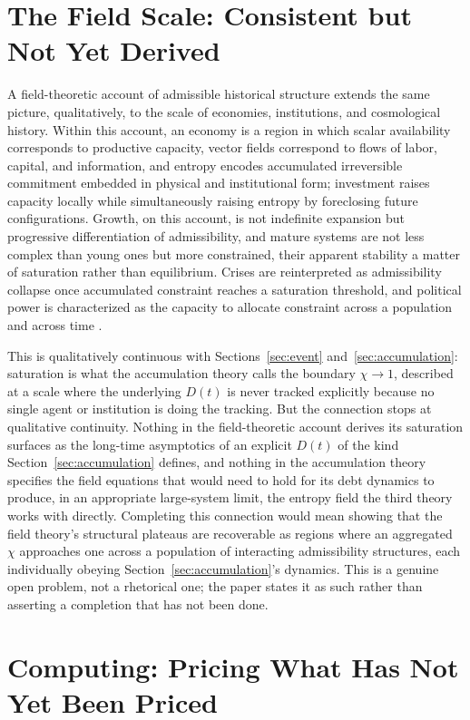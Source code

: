 \documentclass[11pt]{article}
\theoremstyle{plain}
\begin{document}
\section{The Field Scale: Consistent but Not Yet Derived}
\label{sec:field}

A field-theoretic account of admissible historical structure extends the same picture, qualitatively, to the scale of economies, institutions, and cosmological history. Within this account, an economy is a region in which scalar availability corresponds to productive capacity, vector fields correspond to flows of labor, capital, and information, and entropy encodes accumulated irreversible commitment embedded in physical and institutional form; investment raises capacity locally while simultaneously raising entropy by foreclosing future configurations. Growth, on this account, is not indefinite expansion but progressive differentiation of admissibility, and mature systems are not less complex than young ones but more constrained, their apparent stability a matter of saturation rather than equilibrium. Crises are reinterpreted as admissibility collapse once accumulated constraint reaches a saturation threshold, and political power is characterized as the capacity to allocate constraint across a population and across time \citep{rsvptheory}.

This is qualitatively continuous with Sections~\ref{sec:event} and~\ref{sec:accumulation}: saturation is what the accumulation theory calls the boundary $\chi \to 1$, described at a scale where the underlying $D(t)$ is never tracked explicitly because no single agent or institution is doing the tracking. But the connection stops at qualitative continuity. Nothing in the field-theoretic account derives its saturation surfaces as the long-time asymptotics of an explicit $D(t)$ of the kind Section~\ref{sec:accumulation} defines, and nothing in the accumulation theory specifies the field equations that would need to hold for its debt dynamics to produce, in an appropriate large-system limit, the entropy field the third theory works with directly. Completing this connection would mean showing that the field theory's structural plateaus are recoverable as regions where an aggregated $\chi$ approaches one across a population of interacting admissibility structures, each individually obeying Section~\ref{sec:accumulation}'s dynamics. This is a genuine open problem, not a rhetorical one; the paper states it as such rather than asserting a completion that has not been done.

\section{Computing: Pricing What Has Not Yet Been Priced}
\label{sec:computing}
\end{document}

